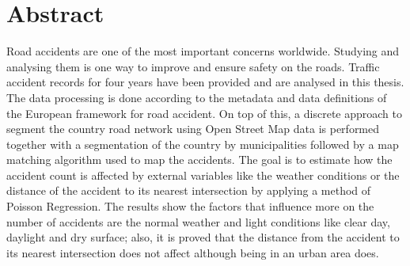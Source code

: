\chapter*{Abstract}
\begin{comment}
Sell your idea!
Make the reader want to stay with you!
Single paragraph, 100-200 words

Four parts/sentences
1. What's the problem
2. How did you solve it
3. What are the results
4. Conclusion (what it means for the future)
Make sure the abstract stands on its own!
-No reference tags
- Avoid acronyms

\end{comment}

Road accidents are one of the most important concerns worldwide. Studying and analysing them is one way to improve and ensure safety on the roads. Traffic accident records for four years have been provided and are analysed in this thesis. The data processing is done according to the metadata and data definitions of the European framework for road accident. On top of this, a discrete approach to segment the country road network using Open Street Map data is performed together with a segmentation of the country by municipalities followed by a map matching algorithm used to map the accidents. The goal is to estimate how the accident count is affected by external variables like the weather conditions or the distance of the accident to its nearest intersection by applying a method of Poisson Regression. The results show the factors that influence more on the number of accidents are the normal weather and light conditions like clear day, daylight and dry surface; also, it is proved that the distance from the accident to its nearest intersection does not affect although being in an urban area does. 
\\
